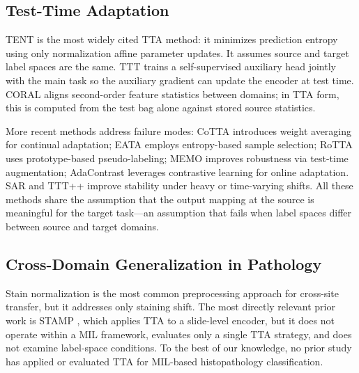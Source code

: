\documentclass[conference]{IEEEtran}
\begin{document}
\subsection{Test-Time Adaptation}

TENT \cite{wang2021tent} is the most widely cited TTA method: it minimizes prediction entropy using only normalization affine parameter updates. It assumes source and target label spaces are the same. TTT \cite{sun2020test} trains a self-supervised auxiliary head jointly with the main task so the auxiliary gradient can update the encoder at test time. CORAL \cite{sun2016coral} aligns second-order feature statistics between domains; in TTA form, this is computed from the test bag alone against stored source statistics.

More recent methods address failure modes: CoTTA \cite{wang2022cotta} introduces weight averaging for continual adaptation; EATA \cite{niu2022eata} employs entropy-based sample selection; RoTTA \cite{yuan2023rotta} uses prototype-based pseudo-labeling; MEMO \cite{zhang2022tip} improves robustness via test-time augmentation; AdaContrast \cite{chen2022adacontrast} leverages contrastive learning for online adaptation. SAR \cite{niu2023towards} and TTT++ \cite{liu2021ttt} improve stability under heavy or time-varying shifts. All these methods share the assumption that the output mapping at the source is meaningful for the target task---an assumption that fails when label spaces differ between source and target domains.

\subsection{Cross-Domain Generalization in Pathology}

Stain normalization \cite{macenko2009method} is the most common preprocessing approach for cross-site transfer, but it addresses only staining shift. The most directly relevant prior work is STAMP \cite{chen2023stamp}, which applies TTA to a slide-level encoder, but it does not operate within a MIL framework, evaluates only a single TTA strategy, and does not examine label-space conditions. To the best of our knowledge, no prior study has applied or evaluated TTA for MIL-based histopathology classification.
\end{document}
